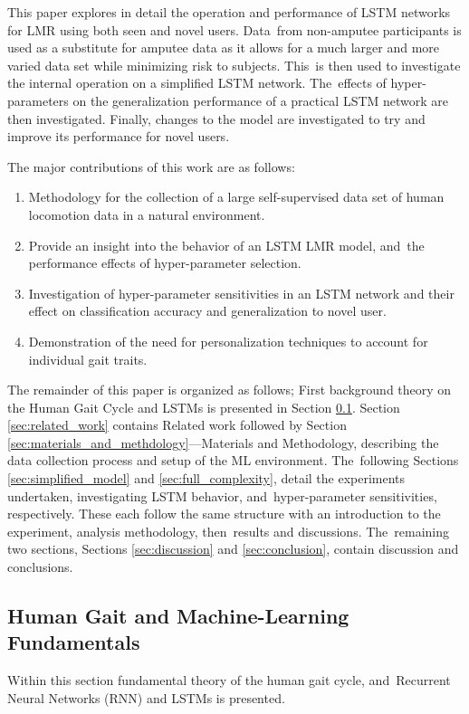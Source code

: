 This paper explores in detail the operation and performance of LSTM networks for LMR using both seen and novel users. Data~from non-amputee participants is used as a substitute for amputee data as it allows for a much larger and more varied data set while minimizing risk to subjects. This~is then used to investigate the internal operation on a simplified LSTM network. The~effects of hyper-parameters on the generalization performance of a practical LSTM network are then investigated. Finally, changes to the model are investigated to try and improve its performance for novel users. 

The major contributions of this work are as follows:
\begin{enumerate}
\item Methodology for the collection of a large self-supervised data set of human locomotion data in a natural environment.
\item Provide an insight into the behavior of an LSTM LMR model, and~the performance effects of hyper-parameter selection.
\item Investigation of hyper-parameter sensitivities in an LSTM network and their effect on classification accuracy and generalization to novel user.
\item Demonstration of the need for personalization techniques to account for individual gait traits.
\end{enumerate}

The remainder of this paper is organized as follows; First background theory on the Human Gait Cycle and LSTMs is presented in Section \ref{sec:theory}. Section \ref{sec:related_work} contains Related work followed by Section \ref{sec:materials_and_methdology}---Materials and Methodology, describing the data collection process and setup of the ML environment. The~following Sections  \ref{sec:simplified_model} and \ref{sec:full_complexity}, detail the experiments undertaken, investigating LSTM behavior, and~hyper-parameter sensitivities, respectively. These each follow the same structure with an introduction to the experiment, analysis methodology, then~results and discussions. The~remaining two sections, Sections \ref{sec:discussion} and \ref{sec:conclusion}, contain discussion and conclusions.

\subsection{Human Gait and Machine-Learning Fundamentals}
\label{sec:theory}
Within this section fundamental theory of the human gait cycle, and~Recurrent Neural Networks (RNN) and LSTMs is presented.


